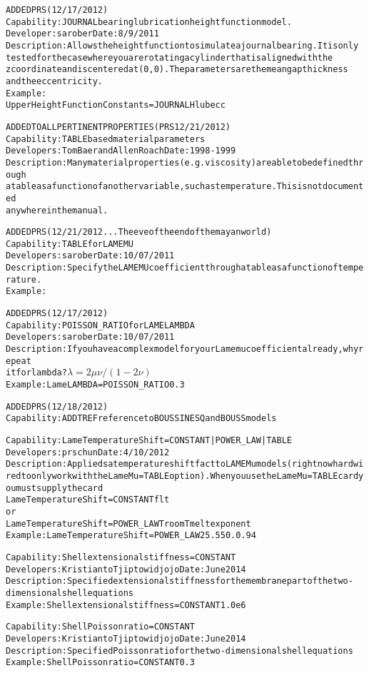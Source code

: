 \documentclass{article}
\begin{document}
\begin{alltt}
ADDED PRS (12/17/2012)
Capability:  JOURNAL bearing lubrication height function model.
Developer:  sarober  Date:  8/9/2011
Description:  Allows the height function to simulate a journal bearing.  It is only 
  tested for the case where you are rotating a cylinder that is aligned with the 
  z coordinate and is centered at (0,0).  The parameters are the mean gap thickness 
  and the eccentricity.  
Example:
  Upper Height Function Constants = JOURNAL {Hlub} {ecc}

ADDED TO ALL PERTINENT PROPERTIES (PRS 12/21/2012)
Capability:  TABLE based material parameters
Developers: Tom Baer and Allen Roach  Date:  1998-1999
Description:  Many material properties (e.g. viscosity) are able to be defined through
  a table as a function of another variable, such as temperature.  This is not documented 
  anywhere in the manual.

ADDED PRS (12/21/2012...The eve of the end of the mayan world)
Capability:  TABLE for LAME MU
Developers:  sarober  Date:  10/07/2011
Description:  Specify the LAME MU coefficient through a table as a function of temperature.
Example:  

ADDED PRS (12/17/2012)
Capability:  POISSON_RATIO for LAME LAMBDA
Developers:  sarober  Date:  10/07/2011
Description: If you have a complex model for your Lame mu coefficient already, why repeat 
  it for lambda?  \(\lambda=2\mu\nu/(1-2\nu)\)
Example:  Lame LAMBDA = POISSON_RATIO 0.3

ADDED PRS (12/18/2012)
Capability: ADD TREF reference to BOUSSINESQ and BOUSS models 

Capability:  Lame Temperature Shift = {CONSTANT | POWER_LAW | TABLE}
Developers: prschun  Date: 4/10/2012
Description: Applieds a temperature shift fact to LAME Mu models (right now hardwired to only work with the Lame Mu = TABLE option).   When you use the Lame Mu = TABLE card you must supply the card
	Lame Temperature Shift = CONSTANT {flt}
or
        Lame Temperature Shift = POWER_LAW {Troom} {Tmelt} {exponent}
Example: Lame Temperature Shift = POWER_LAW 25. 550. 0.94

Capability:  Shell extensional stiffness = {CONSTANT}
Developers: Kristianto Tjiptowidjojo  Date: June 2014
Description: Specified extensional stiffness for the membrane part of the two-dimensional shell equations
Example: Shell extensional stiffness     = CONSTANT	1.0e6

Capability: Shell Poisson ratio = {CONSTANT}
Developers: Kristianto Tjiptowidjojo  Date: June 2014
Description: Specified Poisson ratio for the two-dimensional shell equations
Example: Shell Poisson ratio     = CONSTANT	0.3



\end{alltt}
\end{document}
